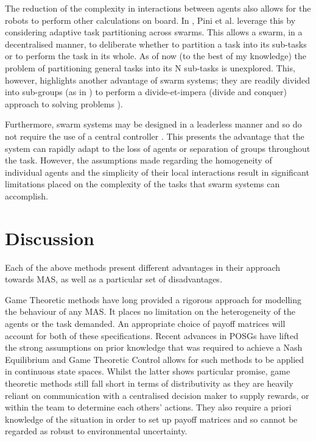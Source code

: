 \documentclass[.../main.tex]{subfiles}
\begin{document}

The reduction of the complexity in interactions between agents also allows for the robots to perform
other calculations on board. In \cite{Pini2011TaskSelection}, Pini et al. leverage this by
considering adaptive task partitioning across swarms. This allows a swarm, in a decentralised
manner, to deliberate whether to partition a task into its sub-tasks or to perform the task in its
whole. As of now (to the best of my knowledge) the problem of partitioning general tasks into its N
sub-tasks is unexplored. This, however, highlights another advantage of swarm systems; they are
readily divided into sub-groups (as in \cite{Zahadat2016DivisionInhibition}) to perform a
divide-et-impera (divide and conquer) approach to solving problems \cite{Pini2011TaskSelection}). 

Furthermore, swarm systems may be designed in a leaderless manner and so do not require the use of a
central controller \cite{Couceiro2015}. This presents the advantage that the system can rapidly
adapt to the loss of agents or separation of groups throughout the task. However, the assumptions
made regarding the homogeneity of individual agents and the simplicity of their local interactions
result in significant limitations placed on the complexity of the tasks that swarm systems can
accomplish.


\section{Discussion} \label{sec:remarks}

Each of the above methods present different advantages in their approach towards MAS, as well as a
particular set of disadvantages. 

Game Theoretic methods have long provided a rigorous approach for
modelling the behaviour of any MAS. It places no limitation on the heterogeneity of the agents or
the task demanded. An appropriate choice of payoff matrices will account for both of these
specifications. Recent advances in POSGs have lifted the strong assumptions on prior knowledge that
was required to achieve a Nash Equilibrium and Game Theoretic Control allows for such methods to be
applied in continuous state spaces. Whilst the latter shows particular promise, game theoretic
methods still fall short in terms of distributivity as they are heavily reliant on communication
with a centralised decision maker to supply rewards, or within the team to determine each others'
actions. They also require a priori knowledge of the situation in order to set up payoff matrices
and so cannot be regarded as robust to environmental uncertainty.
\end{document}
